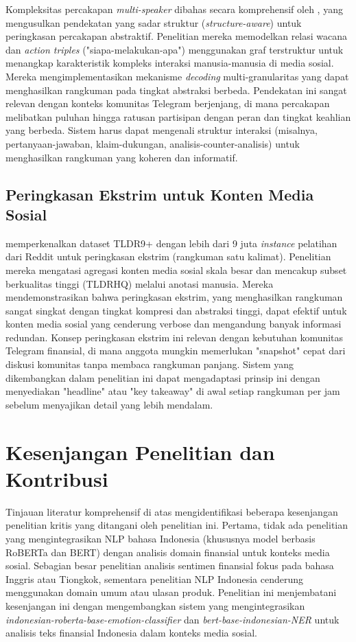 Kompleksitas percakapan \textit{multi-speaker} dibahas secara komprehensif oleh \textcite{chen2021}, yang mengusulkan pendekatan yang sadar struktur (\textit{structure-aware}) untuk peringkasan percakapan abstraktif. Penelitian mereka memodelkan relasi wacana dan \textit{action triples} ("siapa-melakukan-apa") menggunakan graf terstruktur untuk menangkap karakteristik kompleks interaksi manusia-manusia di media sosial. Mereka mengimplementasikan mekanisme \textit{decoding} multi-granularitas yang dapat menghasilkan rangkuman pada tingkat abstraksi berbeda. Pendekatan ini sangat relevan dengan konteks komunitas Telegram berjenjang, di mana percakapan melibatkan puluhan hingga ratusan partisipan dengan peran dan tingkat keahlian yang berbeda. Sistem harus dapat mengenali struktur interaksi (misalnya, pertanyaan-jawaban, klaim-dukungan, analisis-counter-analisis) untuk menghasilkan rangkuman yang koheren dan informatif.

\subsection{Peringkasan Ekstrim untuk Konten Media Sosial}

\textcite{sotudeh2021} memperkenalkan dataset TLDR9+ dengan lebih dari 9 juta \textit{instance} pelatihan dari Reddit untuk peringkasan ekstrim (rangkuman satu kalimat). Penelitian mereka mengatasi agregasi konten media sosial skala besar dan mencakup subset berkualitas tinggi (TLDRHQ) melalui anotasi manusia. Mereka mendemonstrasikan bahwa peringkasan ekstrim, yang menghasilkan rangkuman sangat singkat dengan tingkat kompresi dan abstraksi tinggi, dapat efektif untuk konten media sosial yang cenderung verbose dan mengandung banyak informasi redundan. Konsep peringkasan ekstrim ini relevan dengan kebutuhan komunitas Telegram finansial, di mana anggota mungkin memerlukan "snapshot" cepat dari diskusi komunitas tanpa membaca rangkuman panjang. Sistem yang dikembangkan dalam penelitian ini dapat mengadaptasi prinsip ini dengan menyediakan "headline" atau "key takeaway" di awal setiap rangkuman per jam sebelum menyajikan detail yang lebih mendalam.

\section{Kesenjangan Penelitian dan Kontribusi}
\label{sec:research-gaps}

Tinjauan literatur komprehensif di atas mengidentifikasi beberapa kesenjangan penelitian kritis yang ditangani oleh penelitian ini. Pertama, tidak ada penelitian yang mengintegrasikan NLP bahasa Indonesia (khususnya model berbasis RoBERTa dan BERT) dengan analisis domain finansial untuk konteks media sosial. Sebagian besar penelitian analisis sentimen finansial fokus pada bahasa Inggris atau Tiongkok, sementara penelitian NLP Indonesia cenderung menggunakan domain umum atau ulasan produk. Penelitian ini menjembatani kesenjangan ini dengan mengembangkan sistem yang mengintegrasikan \textit{indonesian-roberta-base-emotion-classifier} dan \textit{bert-base-indonesian-NER} untuk analisis teks finansial Indonesia dalam konteks media sosial.

